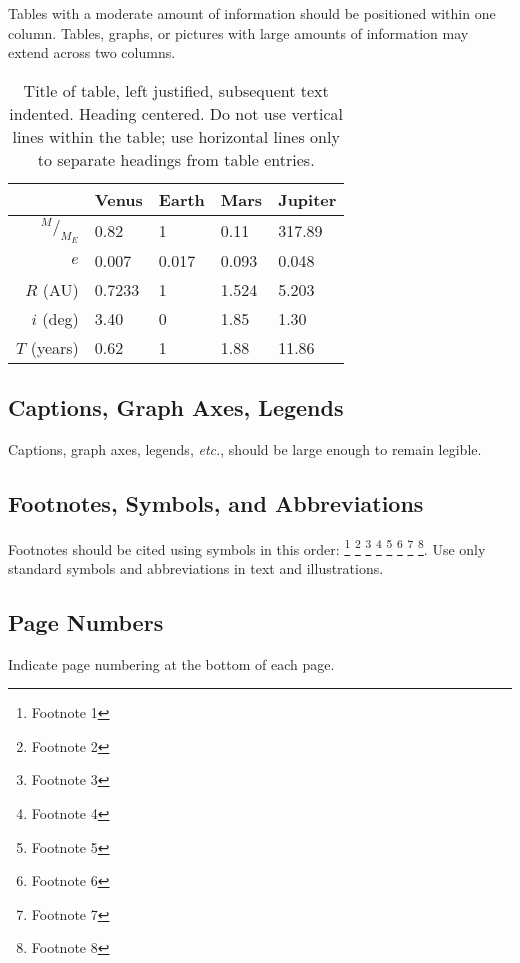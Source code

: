 \documentclass[]{iac}
\newcommand*\rfrac[2]{{{}^{#1}\!/_{#2}}} %
\begin{document}
Tables with a moderate amount of information should be positioned within one column. Tables, graphs, or pictures with large amounts of information may extend across two columns.

\begin{table}
\begin{tabular}{rllll}
\toprule
& Venus & Earth & Mars & Jupiter \\
\midrule
$\rfrac{M}{M_E}$	& 0.82 		& 1 		& 0.11 		& 317.89	\\
$e$					& 0.007		& 0.017		& 0.093		& 0.048		\\
$R$ (AU)			& 0.7233	& 1			& 1.524		& 5.203		\\
$i$ (deg)			& 3.40		& 0			& 1.85		& 1.30		\\
$T$ (years)			& 0.62		& 1			& 1.88		& 11.86		\\
\bottomrule
\end{tabular}
\caption{\label{table:X}Title of table, left justified, subsequent text indented. Heading centered. Do not use vertical lines within the table; use horizontal lines only to separate headings from table entries.}
\end{table}

\subsection{Captions, Graph Axes, Legends}
Captions, graph axes, legends, \textit{etc.}, should be large enough to remain legible.

\subsection{Footnotes, Symbols, and Abbreviations}
Footnotes should be cited using symbols in this order: \footnote{Footnote 1} \footnote{Footnote 2} \footnote{Footnote 3} \footnote{Footnote 4} \footnote{Footnote 5} \footnote{Footnote 6} \footnote{Footnote 7} \footnote{Footnote 8}. Use only standard symbols and abbreviations in text and illustrations.

\subsection{Page Numbers}
Indicate page numbering at the bottom of each page.
\end{document}
